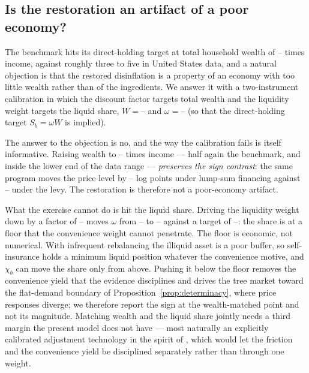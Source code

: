\documentclass[12pt]{article}
\providecommand{\pendingnum}{\textit{--}}
\providecommand{\OwnKVW}{\pendingnum}\providecommand{\OwnKVPrem}{\pendingnum}
\providecommand{\MThrWt}{\pendingnum}\providecommand{\MThrOmT}{\pendingnum}
\providecommand{\MThrW}{\pendingnum}\providecommand{\MThrLS}{\pendingnum}
\providecommand{\MThrLevy}{\pendingnum}\providecommand{\MThrChiFall}{\pendingnum}
\providecommand{\MThrOmA}{\pendingnum}\providecommand{\MThrOmB}{\pendingnum}
\begin{document}
\subsection{Is the restoration an artifact of a poor economy?}
\noindent The benchmark
hits its direct-holding target at total household wealth of $\OwnKVW$ times
income, against roughly three to five in United States data, and a natural
objection is that the restored disinflation is a property of an economy with
too little wealth rather than of the ingredients. We answer it with a
two-instrument calibration in which the discount factor targets total wealth
and the liquidity weight targets the liquid share, $W = \MThrWt$ and
$\omega = \MThrOmT$ (so that the direct-holding target $S_b = \omega W$ is
implied).

The answer to the objection is no, and the way the calibration fails is
itself informative. Raising wealth to $\MThrW$ times income --- half again
the benchmark, and inside the lower end of the data range --- \emph{preserves
the sign contrast}: the same program moves the price level by $\MThrLS$ log
points under lump-sum financing against $\MThrLevy$ under the levy. The
restoration is therefore not a poor-economy artifact.

What the exercise cannot do is hit the liquid share. Driving the liquidity
weight down by a factor of $\MThrChiFall$ moves $\omega$ from $\MThrOmA$ to
$\MThrOmB$ against a target of $\MThrOmT$: the share is at a floor that the
convenience weight cannot penetrate. The floor is economic, not numerical.
With infrequent rebalancing the illiquid asset is a poor buffer, so
self-insurance holds a minimum liquid position whatever the convenience
motive, and $\chi_b$ can move the share only from above. Pushing it below
the floor removes the convenience yield that the \citet{krishnamurthy2012}
evidence disciplines and drives the tree market toward the flat-demand
boundary of Proposition~\ref{prop:determinacy}, where price responses
diverge; we therefore report the sign at the wealth-matched point and not
its magnitude. Matching wealth and the liquid share jointly needs a third
margin the present model does not have --- most naturally an explicitly
calibrated adjustment technology in the spirit of \citet{kaplan2018}, which
would let the friction and the convenience yield be disciplined separately
rather than through one weight.
\end{document}
